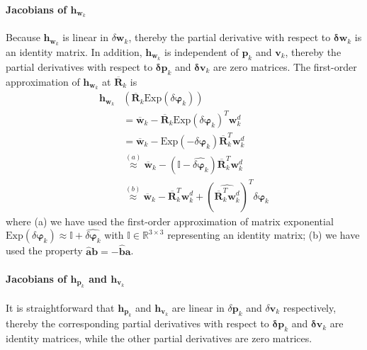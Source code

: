 \paragraph{Jacobians of $\mathbf{h}_{\mathbf{w}_{k}}$}
Because $\mathbf{h}_{\mathbf{w}_{k}}$ is linear in $\delta{\mathbf{w}_{k}}$, thereby the partial derivative with respect to $\mathbf{\delta w}_k$ is an identity matrix. In addition, $\mathbf{h}_{\mathbf{w}_{k}}$ is independent of $\mathbf{p}_k$ and $\mathbf{v}_k$, thereby the partial derivatives with respect to $\mathbf{\delta p}_k$ and $\mathbf{\delta v}_k$ are zero matrices. The first-order approximation of $\mathbf{h}_{\mathbf{w}_{k}}$ at $\overline{\mathbf{R}}_{k}$ is
\begin{align}
\label{eq:h_w_phi}
\mathbf{h}_{\mathbf{w}_{k}}&\left(\overline{\mathbf{R}}_{k}\mathrm{Exp}(\delta{\boldsymbol{\varphi}_{k}})\right) \nonumber \\
&= \overline{\mathbf{w}}_{k} - {\overline{\mathbf{R}}_{k} \mathrm{Exp}(\delta{\boldsymbol{\varphi}_{k}})}^T \mathbf{w}_{k}^{d} \nonumber \\
&= \overline{\mathbf{w}}_{k} - \mathrm{Exp}(-\delta{\boldsymbol{\varphi}}_k) \overline{\mathbf{R}}_{k}^{T} \mathbf{w}_{k}^{d} \nonumber \\
&\overset{(a)}{\approx} \overline{\mathbf{w}}_{k} - (\mathbb{I}-{\widehat{\delta\boldsymbol{\varphi}_k}}) \overline{\mathbf{R}}_{k}^{T} \mathbf{w}_{k}^{d} \nonumber \\
&\overset{(b)}{\approx} \overline{\mathbf{w}}_{k} - \overline{\mathbf{R}}_{k}^{T} \mathbf{w}_{k}^{d} + (\widehat{\overline{\mathbf{R}}_{k}^{T} \mathbf{w}_{k}^{d}} )^{T} \delta \boldsymbol{\varphi}_k
\end{align}
where (a) we have used the first-order approximation of matrix exponential  $\mathrm{Exp}(\delta\boldsymbol{\varphi}_k)\approx\mathbb{I} + {\widehat{\delta\boldsymbol{\varphi}_k}}$ with $\mathbb{I} \in \mathbb{R}^{3\times3}$ representing an identity matrix; (b) we have used the property $\widehat{\mathbf{a}}\mathbf{b}=-\widehat{\mathbf{b}}\mathbf{a}$.

\paragraph{Jacobians of $\mathbf{h}_{\mathbf{p}_{k}}$ and $\mathbf{h}_{\mathbf{v}_{k}}$} 
It is straightforward that $\mathbf{h}_{\mathbf{p}_{k}}$ and $\mathbf{h}_{\mathbf{v}_{k}}$ are linear in $\delta{\mathbf{p}_{k}}$ and $\delta{\mathbf{v}_{k}}$ respectively, thereby the corresponding partial derivatives with respect to $\mathbf{\delta p}_k$ and $\mathbf{\delta v}_k$ are identity matrices, while the other partial derivatives are zero matrices. 

